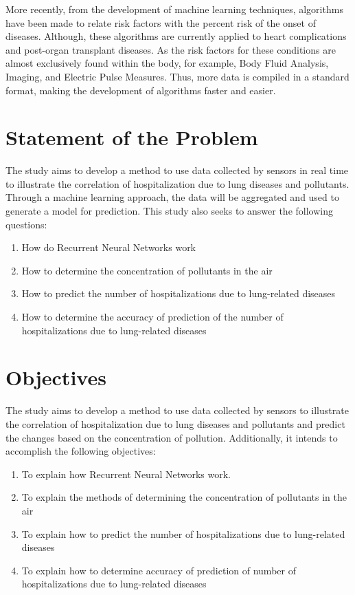 \documentclass[10pt,11pt,12pt,oneside]{book}
\begin{document}
    More recently, from the development of machine learning techniques, algorithms have been made to relate risk factors with the percent risk of the onset of diseases. Although, these algorithms are currently applied to heart complications and post-organ transplant diseases. As the risk factors for these conditions are almost exclusively found within the body, for example, Body Fluid Analysis, Imaging, and Electric Pulse Measures. Thus, more data is compiled in a standard format, making the development of algorithms faster and easier.
    \section{Statement of the Problem}

    The study aims to develop a method to use data collected by sensors in real time to illustrate the correlation of hospitalization due to lung diseases and pollutants. Through a machine learning approach, the data will be aggregated and used to generate a model for prediction. This study also seeks to answer the following questions:
    \begin{enumerate}
        \item How do Recurrent Neural Networks work
        \item How to determine the concentration of pollutants in the air
        \item How to predict the number of hospitalizations due to lung-related diseases
        \item How to determine the accuracy of prediction of the number of hospitalizations due to lung-related diseases
    \end{enumerate}
    \section{Objectives}
    The study aims to develop a method to use data collected by sensors to illustrate the correlation of hospitalization due to lung diseases and pollutants and predict the changes based on the concentration of pollution. Additionally, it intends to accomplish the following objectives:
    \begin{enumerate}
        \item To explain how Recurrent Neural Networks work.
        \item To explain the methods of determining the concentration of pollutants in the air
        \item To explain how to predict the number of hospitalizations due to lung-related diseases
        \item To explain how to determine accuracy of prediction of number of hospitalizations due to lung-related diseases
    \end{enumerate}
\end{document}
